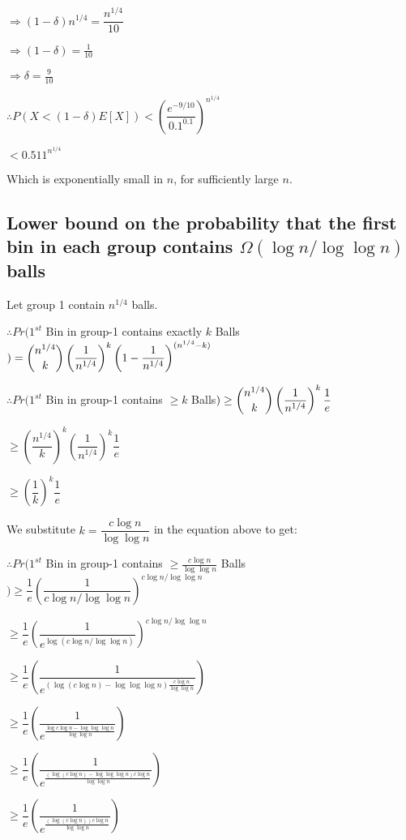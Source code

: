 \documentclass{article}
\begin{document}
$\Rightarrow (1-\delta)n^{1/4} = \dfrac{n^{1/4}}{10}$

$\Rightarrow (1-\delta) = \frac{1}{10}$

$\Rightarrow \delta = \frac{9}{10}$

$\therefore P(X < (1-\delta)E[X]) < \left(\dfrac{e^{-9/10}}{0.1^{0.1}}\right)^{n^{1/4}}$

$< 0.511^{n^{1/4}}$

Which is exponentially small in $n$, for sufficiently large $n$.


\subsection{Lower bound on the probability that the first bin in each group contains $\Omega(\log{n}/\log{\log{n}})$ balls}

Let group 1 contain $n^{1/4}$ balls.

$\therefore Pr(1^{st}$ Bin in group-1 contains exactly $k$ Balls$) = \dbinom{n^{1/4}}{k} \left( \dfrac{1}{n^{1/4}} \right)^{k} \left( 1 - \dfrac{1}{n^{1/4}} \right)^{(n^{1/4} - k)}$

$\therefore Pr(1^{st}$ Bin in group-1 contains $\ge k$ Balls$) \ge \dbinom{n^{1/4}}{k} \left( \dfrac{1}{n^{1/4}} \right)^{k} \dfrac{1}{e}$

$\ge \left(\dfrac{n^{1/4}}{k}\right)^{k} \left( \dfrac{1}{n^{1/4}} \right)^{k} \dfrac{1}{e}$

$\ge \left(\dfrac{1}{k}\right)^{k} \dfrac{1}{e}$

We substitute $k = \dfrac{c\log{n}}{\log{\log{n}}}$ in the equation above to get:

$\therefore Pr(1^{st}$ Bin in group-1 contains $\ge \frac{c\log{n}}{\log{\log{n}}}$ Balls$) \ge \dfrac{1}{e} \left(\dfrac{1}{c\log{n}/\log{\log{n}}}\right)^{c\log{n}/\log{\log{n}}}$

$\ge \dfrac{1}{e} \left(\dfrac{1}{{e}^{\log{(c\log{n}/\log{\log{n}})}}}\right)^{c\log{n}/\log{\log{n}}}$

$\ge \dfrac{1}{e} \left(\dfrac{1}{{e}^{(\log{(c\log{n})} - \log{\log{\log{n}}})\frac{c\log{n}}{\log{\log{n}}}}} \right)$

$\ge \dfrac{1}{e} \left(\dfrac{1}{{e}^{\frac{\log{c\log{n}} - \log{\log{\log{n}}}}{\log{\log{n}}}}} \right)$

$\ge \dfrac{1}{e} \left(\dfrac{1}{{e}^{\frac{(\log{(c\log{n})} - \log{\log{\log{n}}})c\log{n}}{\log{\log{n}}}}} \right)$ 

$\ge \dfrac{1}{e} \left(\dfrac{1}{{e}^{\frac{(\log{(c\log{n})})c\log{n}}{\log{\log{n}}}}} \right)$ 
\end{document}
